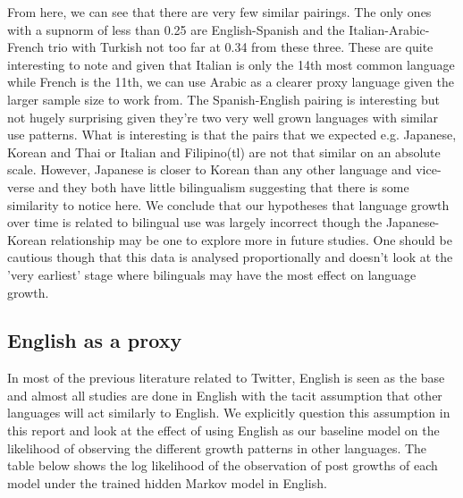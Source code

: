 \documentclass[12pt]{article}
\begin{document}
\FloatBarrier
From here, we can see that there are very few similar pairings. The only ones with a supnorm of less than 0.25 are English-Spanish and the Italian-Arabic-French trio with Turkish not too far at 0.34 from these three. These are quite interesting to note and given that Italian is only the 14th most common language while French is the 11th, we can use Arabic as a clearer proxy language given the larger sample size to work from. The Spanish-English pairing is interesting but not hugely surprising given they're two very well grown languages with similar use patterns. What is interesting is that the pairs that we expected e.g. Japanese, Korean and Thai or Italian and Filipino(tl) are not that similar on an absolute scale. However, Japanese is closer to Korean than any other language and vice-verse and they both have little bilingualism suggesting that there is some similarity to notice here.  We conclude that our hypotheses that language growth over time is related to bilingual use was largely incorrect though the Japanese-Korean relationship may be one to explore more in future studies. One should be cautious though that this data is analysed proportionally and doesn't look at the 'very earliest' stage where bilinguals may have the most effect on language growth.
\subsection{English as a proxy}
In most of the previous literature related to Twitter, English is seen as the base and almost all studies are done in English with the tacit assumption that other languages will act similarly to English. We explicitly question this assumption in this report and look at the effect of using English as our baseline model on the likelihood of observing the different growth patterns in other languages.  The table below shows the log likelihood of the observation of post growths of each model under the trained hidden Markov model \cite{Distancemetric} in English.
\end{document}
